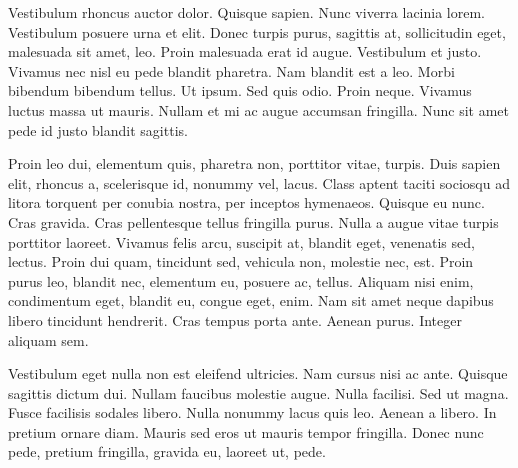 \documentclass[printmode,mgr,pl]{mgr}
\begin{document}
Vestibulum rhoncus auctor dolor. Quisque sapien. Nunc viverra lacinia
lorem. Vestibulum posuere urna et elit. Donec turpis purus, sagittis
at, sollicitudin eget, malesuada sit amet, leo. Proin malesuada erat
id augue. Vestibulum et justo. Vivamus nec nisl eu pede blandit
pharetra. Nam blandit est a leo. Morbi bibendum bibendum tellus. Ut
ipsum. Sed quis odio. Proin neque. Vivamus luctus massa ut
mauris. Nullam et mi ac augue accumsan fringilla. Nunc sit amet pede
id justo blandit sagittis.

Proin leo dui, elementum quis, pharetra non, porttitor vitae,
turpis. Duis sapien elit, rhoncus a, scelerisque id, nonummy vel,
lacus. Class aptent taciti sociosqu ad litora torquent per conubia
nostra, per inceptos hymenaeos. Quisque eu nunc. Cras gravida. Cras
pellentesque tellus fringilla purus. Nulla a augue vitae turpis
porttitor laoreet. Vivamus felis arcu, suscipit at, blandit eget,
venenatis sed, lectus. Proin dui quam, tincidunt sed, vehicula non,
molestie nec, est. Proin purus leo, blandit nec, elementum eu, posuere
ac, tellus. Aliquam nisi enim, condimentum eget, blandit eu, congue
eget, enim. Nam sit amet neque dapibus libero tincidunt
hendrerit. Cras tempus porta ante. Aenean purus. Integer aliquam sem.

Vestibulum eget nulla non est eleifend ultricies. Nam cursus nisi ac
ante. Quisque sagittis dictum dui. Nullam faucibus molestie
augue. Nulla facilisi. Sed ut magna. Fusce facilisis sodales
libero. Nulla nonummy lacus quis leo. Aenean a libero. In pretium
ornare diam. Mauris sed eros ut mauris tempor fringilla. Donec nunc
pede, pretium fringilla, gravida eu, laoreet ut, pede.



\end{document}
